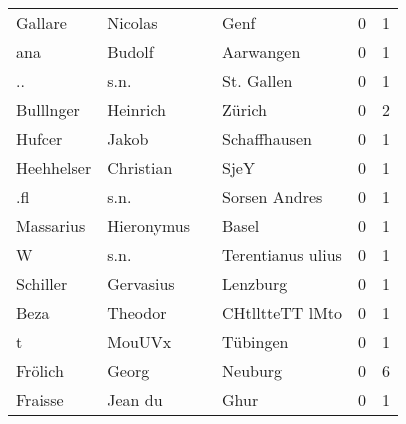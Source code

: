 \begin{center}
\begin{tiny}
\begin{longtabu}{llllrr}
                  Gallare &                            Nicolas &             &                                        Genf &          0 &         1 \\
                      ana &                             Budolf &             &                                   Aarwangen &          0 &         1 \\
                       .. &                               s.n. &             &                                  St. Gallen &          0 &         1 \\
                Bulllnger &                           Heinrich &             &                                      Zürich &          0 &         2 \\
                   Hufcer &                              Jakob &             &                                Schaffhausen &          0 &         1 \\
               Heehhelser &                          Christian &             &                                        SjeY &          0 &         1 \\
                      .fl &                               s.n. &             &                               Sorsen Andres &          0 &         1 \\
                Massarius &                         Hieronymus &             &                                       Basel &          0 &         1 \\
                        W &                               s.n. &             &                           Terentianus ulius &          0 &         1 \\
                 Schiller &                          Gervasius &             &                                    Lenzburg &          0 &         1 \\
                     Beza &                            Theodor &             &                             CHtlltteTT lMto &          0 &         1 \\
                        t &                             MouUVx &             &                                    Tübingen &          0 &         1 \\
                  Frölich &                              Georg &             &                                     Neuburg &          0 &         6 \\
                  Fraisse &                            Jean du &             &                                        Ghur &          0 &         1 \\

\end{longtabu}
\end{tiny}
\end{center}
